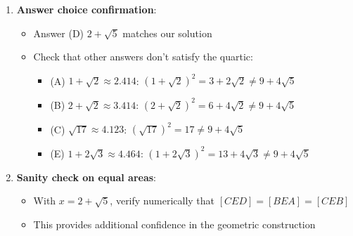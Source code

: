 \documentclass[]{article}
\begin{document}
\begin{verificationbox}
\begin{enumerate}
    \item \textbf{Answer choice confirmation}:
    \begin{itemize}
        \item Answer (D) $2 + \sqrt{5}$ matches our solution \checkmark
        \item Check that other answers don't satisfy the quartic:
        \begin{itemize}
            \item (A) $1+\sqrt{2} \approx 2.414$: $(1+\sqrt{2})^2 = 3 + 2\sqrt{2} \neq 9 + 4\sqrt{5}$
            \item (B) $2+\sqrt{2} \approx 3.414$: $(2+\sqrt{2})^2 = 6 + 4\sqrt{2} \neq 9 + 4\sqrt{5}$
            \item (C) $\sqrt{17} \approx 4.123$: $(\sqrt{17})^2 = 17 \neq 9 + 4\sqrt{5}$
            \item (E) $1+2\sqrt{3} \approx 4.464$: $(1+2\sqrt{3})^2 = 13 + 4\sqrt{3} \neq 9 + 4\sqrt{5}$
        \end{itemize}
    \end{itemize}
    
    \item \textbf{Sanity check on equal areas}:
    \begin{itemize}
        \item With $x = 2 + \sqrt{5}$, verify numerically that $[CED] = [BEA] = [CEB]$
        \item This provides additional confidence in the geometric construction
    \end{itemize}
\end{enumerate}
\end{verificationbox}
\end{document}
